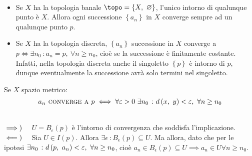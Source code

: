 \begin{examples}~{}
	\begin{itemize}
		\item Se $X$ ha la topologia banale $\topo=\left\{X,\ \emptyset\right\}$, l'unico intorno di qualunque punto è $X$. Allora ogni successione $\left\{a_n\right\}$ in $X$ converge sempre ad un qualunque punto $p$.
		\item Se $X$ ha la topologia discreta, $\left\{a_n\right\}$ successione in $X$ converge a $p\iff \exists n_0\ \colon a_n=p,\ \forall n\geq n_0$, cioè se la successione è finitamente costante. Infatti, nella topologia discreta anche il singoletto $\left\{p\right\}$ è intorno di $p$, dunque eventualmente la successione avrà solo termini nel singoletto.
	\end{itemize}
\end{examples}
\begin{observe}
Se $X$ spazio metrico:
\begin{equation}
	a_n\textsc{ converge a } p\iff \forall \varepsilon>0\ \exists n_0\ \colon d\left(x,\ y\right)<\varepsilon,\ \forall n\geq n_0
\end{equation}
\vspace{-8mm}
\end{observe}
\begin{demonstration}~{}\\
	$\implies)\quad$ $U=B_{\epsilon}\left(p\right)$ è l'intorno di convergenza che soddisfa l'implicazione.\\
	$\impliedby)\quad$ Sia $U\in I\left(p\right)$. Allora $\exists \epsilon\ \colon B_{\epsilon}\left(p\right)\subseteq U$. Ma allora, dato che per le ipotesi $\exists n_0\ \colon d\left(p,\ a_n\right)<\varepsilon,\ \forall n\geq n_0$, cioè $a_n\in B_{\epsilon}\left(p\right)\subseteq U\implies a_n\in U\forall n\geq n_0$.
\end{demonstration}

